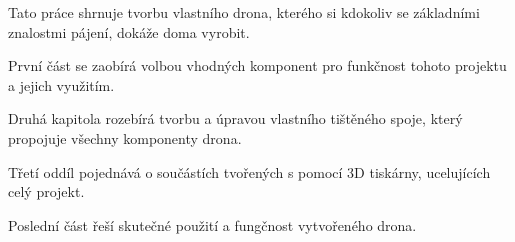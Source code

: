 Tato práce shrnuje tvorbu vlastního drona, kterého si kdokoliv se základními znalostmi pájení, dokáže doma vyrobit.

První část se zaobírá volbou vhodných komponent pro funkčnost tohoto projektu a jejich využitím.

Druhá kapitola rozebírá tvorbu a úpravou vlastního tištěného spoje, který propojuje všechny komponenty drona.

Třetí oddíl pojednává o součástích tvořených s pomocí 3D tiskárny, ucelujících celý projekt.

Poslední část řeší skutečné použití a fungčnost vytvořeného drona.